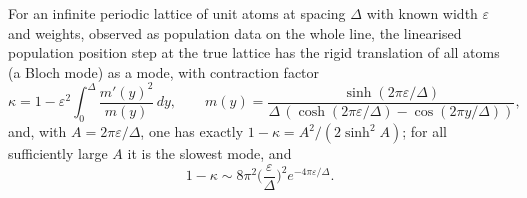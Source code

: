 \begin{proposition}\label{qt:prop:lattice}
For an infinite periodic lattice of unit atoms at spacing $\Delta$ with known width $\varepsilon$ and weights, observed as population data on the whole line, the linearised population position step at the true lattice has the rigid translation of all atoms (a Bloch mode) as a mode, with contraction factor
\[
\kappa=1-\varepsilon^2\int_0^\Delta\frac{m'(y)^2}{m(y)}\,dy,\qquad m(y)=\frac{\sinh(2\pi\varepsilon/\Delta)}{\Delta\,(\cosh(2\pi\varepsilon/\Delta)-\cos(2\pi y/\Delta))},
\]
and, with $A=2\pi\varepsilon/\Delta$, one has exactly $1-\kappa=A^2/(2\sinh^2A)$; for all sufficiently large $A$ it is the slowest mode, and
\[
1-\kappa\sim8\pi^2\Big(\frac\varepsilon\Delta\Big)^2e^{-4\pi\varepsilon/\Delta}.
\]
\end{proposition}

